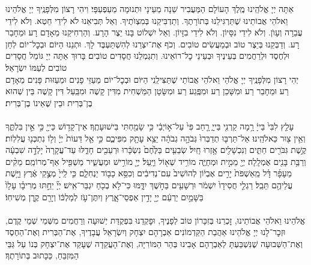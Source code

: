 \documentclass[twoside, openany, parskip=half, 11pt]{book}
\begin{document}
אַתָּה יְיָ אֱלֹהֵֽינוּ מֶֽלֶךְ הָעוֹלָם הַמַּעֲבִיר שֵׁנָה מֵעֵינָי וּתְנוּמָה מֵעַפְעַפָּי׃ וִיהִי רָצוֹן מִלְּפָנֶֽיךָ יְיָ אֱלֹהֵינוּ וֵאלֹהֵי אֲבוֹתֵינוּ שֶׁתַּרְגִּילֵנוּ בְּתוֹרָתֶךָ. וְתַדְבִּיקֵנוּ בְּמִצְוׂתֶיךָ. וְאַל תְּבִיאֵנוּ לֹא לִידֵי חֵטְא. וְלֹא לִידֵי עֲבֵרָה וְעָוׂן. וְלֹא לִידֵי נִסָּיוֹן. וְלֹא לִידֵי בִזָּיוֹן. וְאַל יִשְׁלוֹט בָּנוּ יֵצֶר הָרָע. וְהַרְחִיקֵנוּ מֵאָדָם רָע וּמֵחָבֵר רָע. וְדַבְּקֵנוּ בְּיֵצֶר טוֹב וּבְמַעֲשִׂים טוֹבִים. וְכֹף אֶת־יִצְרֵנוּ לְהִשְׁתַּעְבֶּד לָךְ. וּתְנֵנוּ הַיּוֹם וּבְכׇל־יוֹם לְחֵן וּלְחֶסֶד וּלְרַחֲמִים בְּעֵינֶיךָ וּבְעֵינֵי כׇל־רוֹאֵינוּ. וְתִגְמְלֵנוּ חֲסָדִים טוֹבִים׃ בָּרוּךְ אַתָּה יְיָ גּוֹמֵל חֲסָדִים טוֹבִים לְעַמּוֹ יִשְׂרָאֵל׃\\
יְהִי רָצוֹן מִלְּפָנֶֽיךָ יְיָ אֱלֹהַי וֵאלֹהֵי אֲבוֹתַי שֶׁתַּצִּילֵֽנִי הַיּוֹם וּבְכׇל־יוֹם מֵעַזֵּי פָנִים וּמֵעַזּוּת פָּנִים מֵאָדָם רַע וּמֵחָבֵר רַע וּמִשָּׁכֵן רַע וּמִפֶּֽגַע רַע וּמִשָּׂטָן הַמַּשְׁחִית מִדִּין קָשֶׁה וּמִבַּֽעַל דִּין קָשֶׁה בֵּין שְׁהוּא בֶן־בְּרִית וּבֵין שֶׁאֵינוֹ בֶן־בְּרִית׃\\
\\
עָלַ֤ץ לִבִּי֙ בַּייָ֔ רָ֥מָה קַרְנִ֖י בַּייָ֑ רָ֤חַב פִּי֙ עַל־א֣וֹיְבַ֔י כִּ֥י שָׂמַ֖חְתִּי בִּישׁוּעָתֶֽךָ׃ אֵין־קָד֥וֹשׁ כַּייָ֖ כִּ֣י אֵ֣ין בִּלְתֶּ֑ךָ וְאֵ֥ין צ֖וּר כֵּאלֹהֵֽינוּ׃ אַל־תַּרְבּ֤וּ תְדַבְּרוּ֙ גְּבֹהָ֣ה גְבֹהָ֔ה יֵצֵ֥א עָתָ֖ק מִפִּיכֶ֑ם כִּ֣י אֵ֤ל דֵּעוֹת֙ יְיָ֔ וְל֥וֹ נִתְכְּנ֖וּ עֲלִלֽוֹת׃ קֶ֥שֶׁת גִּבֹּרִ֖ים חַתִּ֑ים וְנִכְשָׁלִ֖ים אָ֥זְרוּ חָֽיִל׃ שְׂבֵעִ֤ים בַּלֶּ֙חֶם֙ נִשְׂכָּ֔רוּ וּרְעֵבִ֖ים חָדֵ֑לּוּ עַד־עֲקָרָה֙ יָלְדָ֣ה שִׁבְעָ֔ה וְרַבַּ֥ת בָּנִ֖ים אֻמְלָֽלָה׃ יְיָ֖ מֵמִ֣ית וּמְחַיֶּ֑ה מוֹרִ֥יד שְׁא֖וֹל וַיָּֽעַל׃ יְיָ֖ מוֹרִ֣ישׁ וּמַעֲשִׁ֑יר מַשְׁפִּ֖יל אַף־מְרוֹמֵֽם׃ מֵקִ֨ים מֵעָפָ֜ר דָּ֗ל מֵֽאַשְׁפֹּת֙ יָרִ֣ים אֶבְי֔וֹן לְהוֹשִׁיב֙ עִם־נְדִיבִ֔ים וְכִסֵּ֥א כָב֖וֹד יַנְחִלֵ֑ם כִּ֤י לַֽייָ֙ מְצֻ֣קֵי אֶ֔רֶץ וַיָּ֥שֶׁת עֲלֵיהֶ֖ם תֵּבֵֽל׃ רַגְלֵ֤י חֲסִידָו֙ יִשְׁמֹ֔ר וּרְשָׁעִ֖ים בַּחֹ֣שֶׁךְ יִדָּ֑מּוּ כִּי־לֹ֥א בְכֹ֖חַ יִגְבַּר־אִֽישׁ׃ יְיָ֞ יֵחַ֣תּוּ מְרִיבָ֗ו עָלָו֙ בַּשָּׁמַ֣יִם יַרְעֵ֔ם יְיָ֖ יָדִ֣ין אַפְסֵי־אָ֑רֶץ וְיִתֶּן־עֹ֣ז לְמַלְכּ֔וֹ וְיָרֵ֖ם קֶ֥רֶן מְשִׁיחֽוֹ׃\\
\\
אֱלֹהֵינוּ וֵאלֹהֵי אֲבוֹתֵינוּ, זׇכְרֵנוּ בְּזִכָּרוֹן טוֹב לְפָנֶיךָ, וּפׇקְדֵנוּ בִּפְקֻדַּת יְשׁוּעָה וְרַחֲמִים מִשְּׁמֵי שְׁמֵי קֶדֶם, וּזְכׇר־לָנוּ יְיָ אֱלֹהֵינוּ אַהֲבַת הַקַּדְמוֹנִים אַבְרָהָם יִצְחָק וְיִשְׂרָאֵל עֲבָדֶיךָ, אֶת־הַבְּרִית וְאֶת־הַחֶסֶד וְאֶת־הַשְּׁבוּעָה שֶׁנִּשְׁבַּעְתָּ לְאַבְרָהָם אָבִינוּ בְּהַר הַמּוֹרִיָּה, וְאֶת־הָעֲקֵדָה שֶׁעָקַד אֶת־יִצְחָק בְּנוֹ עַל גַּבֵּי הַמִּזְבֵּחַ, כַּכָּתוּב בְּתוֹרָתֶךָ׃\\
\end{document}
